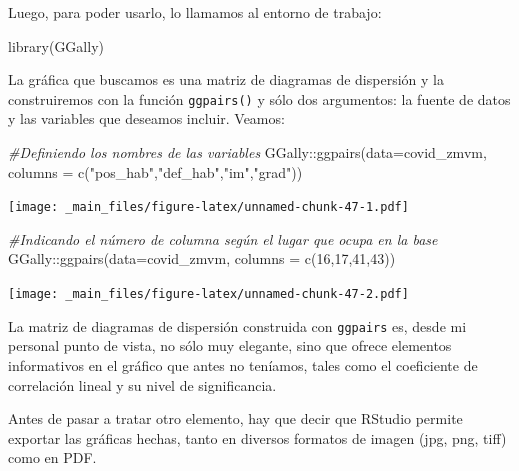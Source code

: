 \documentclass[
  11pt,
  oneside]{book}
\newenvironment{Shaded}{\begin{snugshade}}{\end{snugshade}}
\newcommand{\AttributeTok}[1]{\textcolor[rgb]{0.77,0.63,0.00}{#1}}
\newcommand{\CommentTok}[1]{\textcolor[rgb]{0.56,0.35,0.01}{\textit{#1}}}
\newcommand{\DecValTok}[1]{\textcolor[rgb]{0.00,0.00,0.81}{#1}}
\newcommand{\FunctionTok}[1]{\textcolor[rgb]{0.00,0.00,0.00}{#1}}
\newcommand{\NormalTok}[1]{#1}
\newcommand{\SpecialCharTok}[1]{\textcolor[rgb]{0.00,0.00,0.00}{#1}}
\newcommand{\StringTok}[1]{\textcolor[rgb]{0.31,0.60,0.02}{#1}}
\begin{document}
Luego, para poder usarlo, lo llamamos al entorno de trabajo:

\begin{Shaded}
\begin{Highlighting}[]
\FunctionTok{library}\NormalTok{(GGally)}
\end{Highlighting}
\end{Shaded}

La gráfica que buscamos es una matriz de diagramas de dispersión y la construiremos con la función \texttt{ggpairs()} y sólo dos argumentos: la fuente de datos y las variables que deseamos incluir. Veamos:

\begin{Shaded}
\begin{Highlighting}[]
\CommentTok{\#Definiendo los nombres de las variables}
\NormalTok{GGally}\SpecialCharTok{::}\FunctionTok{ggpairs}\NormalTok{(}\AttributeTok{data=}\NormalTok{covid\_zmvm, }\AttributeTok{columns =} \FunctionTok{c}\NormalTok{(}\StringTok{"pos\_hab"}\NormalTok{,}\StringTok{"def\_hab"}\NormalTok{,}\StringTok{"im"}\NormalTok{,}\StringTok{"grad"}\NormalTok{))}
\end{Highlighting}
\end{Shaded}

\texttt{[image: \_main\_files/figure-latex/unnamed-chunk-47-1.pdf]}

\begin{Shaded}
\begin{Highlighting}[]
\CommentTok{\#Indicando el número de columna según el lugar que ocupa en la base}
\NormalTok{GGally}\SpecialCharTok{::}\FunctionTok{ggpairs}\NormalTok{(}\AttributeTok{data=}\NormalTok{covid\_zmvm, }\AttributeTok{columns =} \FunctionTok{c}\NormalTok{(}\DecValTok{16}\NormalTok{,}\DecValTok{17}\NormalTok{,}\DecValTok{41}\NormalTok{,}\DecValTok{43}\NormalTok{))}
\end{Highlighting}
\end{Shaded}

\texttt{[image: \_main\_files/figure-latex/unnamed-chunk-47-2.pdf]}

La matriz de diagramas de dispersión construida con \texttt{ggpairs} es, desde mi personal punto de vista, no sólo muy elegante, sino que ofrece elementos informativos en el gráfico que antes no teníamos, tales como el coeficiente de correlación lineal y su nivel de significancia.

Antes de pasar a tratar otro elemento, hay que decir que RStudio permite exportar las gráficas hechas, tanto en diversos formatos de imagen (jpg, png, tiff) como en PDF.
\end{document}
